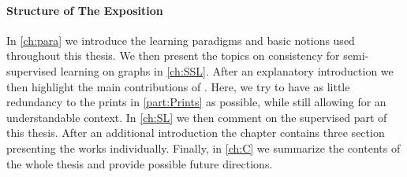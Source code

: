 \paragraph{Structure of The Exposition} In \cref{ch:para} we introduce the learning paradigms and basic notions used throughout this thesis. We then present the topics on consistency for semi-supervised learning on graphs in \cref{ch:SSL}. After an explanatory introduction we then highlight the main contributions of \cite{roith2022continuum,bungert2021uniform}. Here, we try to have as little redundancy to the prints in \cref{part:Prints} as possible, while still allowing for an understandable context. In \cref{ch:SL} we then comment on the supervised part of this thesis. After an additional introduction the chapter contains three section presenting the works \cite{kabri2023resolution,bungert2021clip,bungert2022bregman} individually. Finally, in \cref{ch:C} we summarize the contents of the whole thesis and provide possible future directions.

